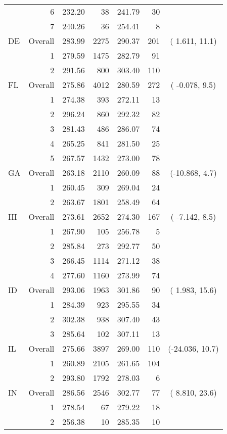 \begin{longtable}{lrrr@{\extracolsep{.25cm}}rrc}
   & 6 & 232.20 &  38 & 241.79 &  30 &  \\ 
   & 7 & 240.26 &  36 & 254.41 &   8 &  \\ 
   \hline
DE & Overall & 283.99 & 2275 & 290.37 & 201 & (  1.611,  11.1) \\ 
   & 1 & 279.59 & 1475 & 282.79 &  91 &  \\ 
   & 2 & 291.56 & 800 & 303.40 & 110 &  \\ 
   \hline
FL & Overall & 275.86 & 4012 & 280.59 & 272 & ( -0.078,   9.5) \\ 
   & 1 & 274.38 & 393 & 272.11 &  13 &  \\ 
   & 2 & 296.24 & 860 & 292.32 &  82 &  \\ 
   & 3 & 281.43 & 486 & 286.07 &  74 &  \\ 
   & 4 & 265.25 & 841 & 281.50 &  25 &  \\ 
   & 5 & 267.57 & 1432 & 273.00 &  78 &  \\ 
   \hline
GA & Overall & 263.18 & 2110 & 260.09 &  88 & (-10.868,   4.7) \\ 
   & 1 & 260.45 & 309 & 269.04 &  24 &  \\ 
   & 2 & 263.67 & 1801 & 258.49 &  64 &  \\ 
   \hline
HI & Overall & 273.61 & 2652 & 274.30 & 167 & ( -7.142,   8.5) \\ 
   & 1 & 267.90 & 105 & 256.78 &   5 &  \\ 
   & 2 & 285.84 & 273 & 292.77 &  50 &  \\ 
   & 3 & 266.45 & 1114 & 271.12 &  38 &  \\ 
   & 4 & 277.60 & 1160 & 273.99 &  74 &  \\ 
   \hline
ID & Overall & 293.06 & 1963 & 301.86 &  90 & (  1.983,  15.6) \\ 
   & 1 & 284.39 & 923 & 295.55 &  34 &  \\ 
   & 2 & 302.38 & 938 & 307.40 &  43 &  \\ 
   & 3 & 285.64 & 102 & 307.11 &  13 &  \\ 
   \hline
IL & Overall & 275.66 & 3897 & 269.00 & 110 & (-24.036,  10.7) \\ 
   & 1 & 260.89 & 2105 & 261.65 & 104 &  \\ 
   & 2 & 293.80 & 1792 & 278.03 &   6 &  \\ 
   \hline
IN & Overall & 286.56 & 2546 & 302.77 &  77 & (  8.810,  23.6) \\ 
   & 1 & 278.54 &  67 & 279.22 &  18 &  \\ 
   & 2 & 256.38 &  10 & 285.35 &  10 &  \\ 

\end{longtable}
